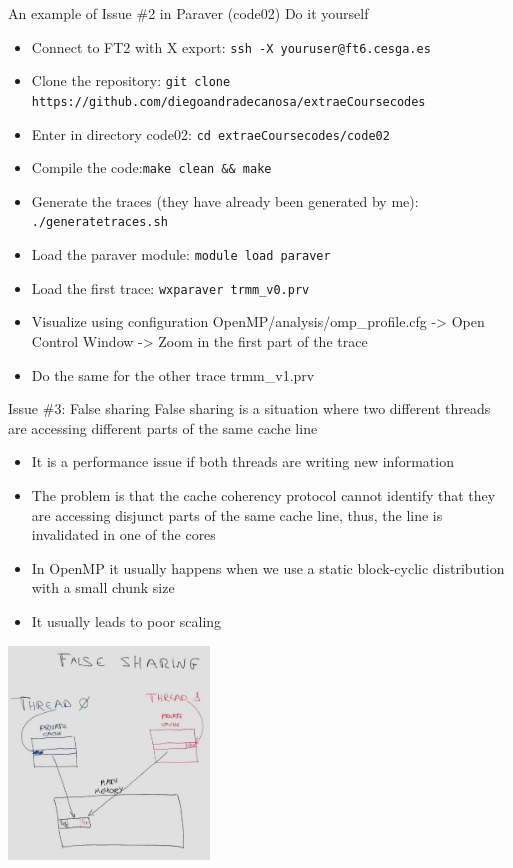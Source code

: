 \documentclass[10pt,xcolor=table]{beamer}
\begin{document}
\begin{frame}{An example of Issue \#2 in Paraver (code02)}
Do it yourself
\begin{itemize}
    \item Connect to FT2 with X export: {\tt ssh -X youruser@ft6.cesga.es}
    \item Clone the repository: {\tt git clone https://github.com/diegoandradecanosa/extraeCoursecodes}
    \item Enter in directory code02: {\tt cd extraeCoursecodes/code02}
        \item Compile the code:{\tt make clean \&\& make}

    \item Generate the traces (they have already been generated by me): {\tt ./generatetraces.sh}
    \item Load the paraver module:  {\tt module load paraver}
    \item Load the first trace: {\tt wxparaver trmm\_v0.prv}
    \item Visualize using configuration OpenMP/analysis/omp\_profile.cfg -> Open Control Window -> Zoom in the first part of the trace
    \item Do the same for the other trace trmm\_v1.prv
\end{itemize}
\end{frame}


\begin{frame}{Issue \#3: False sharing}
False sharing is a situation where two different threads are accessing different  parts of the same cache line
\begin{itemize}
    \footnotesize
    \item It is a performance issue if both threads are writing new information
    \item The problem is that the cache coherency protocol cannot identify that they are accessing disjunct parts of the same cache line, thus, the line is invalidated in one of the cores
    \item In OpenMP it usually happens when we use a static block-cyclic distribution with a small chunk size
    \item It usually leads to poor scaling
\end{itemize}
\centering
\includegraphics[width=0.4\textwidth]{figs/myfalsesharing.jpg}
\end{frame}
\end{document}
